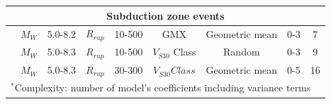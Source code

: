 \begin{landscape}
\begin{table}
{\begin{tabular}{|c|c|c|c|c|c|c|c|c|}
\hline \multicolumn{9}{|c|}{Subduction zone events}\\
\hline \citet{eqrm_Youngs97} & $M_W$ & 5.0-8.2 &
$R_{rup}$& 10-500& GMX & Geometric mean & 0-3 & 7\\
\hline \citet{eqrm_Atkinson03}& $M_W$ & 5.0-8.3 &
$R_{rup}$& 10-500& $V_{S30}$ Class & Random & 0-3 & 9\\
\hline \citet{eqrm_Zhao06} & $M_W$ & 5.0-8.3 & $R_{rup}$ &
30-300& $V_{S30} Class$ & Geometric mean & 0-5 & 16\\
\hline
\multicolumn{9}{l}{$^{*}$Complexity: number of model's coefficients including variance terms}\\
\end{tabular}}
\end{table}
\end{landscape}




